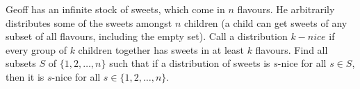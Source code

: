 Geoff has an infinite stock of sweets, which come in $n$ flavours. He arbitrarily distributes some of the sweets amongst $n$ children (a child can get sweets of any subset of all flavours, including the empty set). Call a distribution $k-\textit{nice}$ if every group of $k$ children together has sweets in at least $k$ flavours. Find all subsets $S$ of $\{ 1, 2, \dots, n \}$ such that if a distribution of sweets is $s$-nice for all $s \in S$,  then it is $s$-nice for all $s \in \{ 1, 2, \dots, n \}$.
